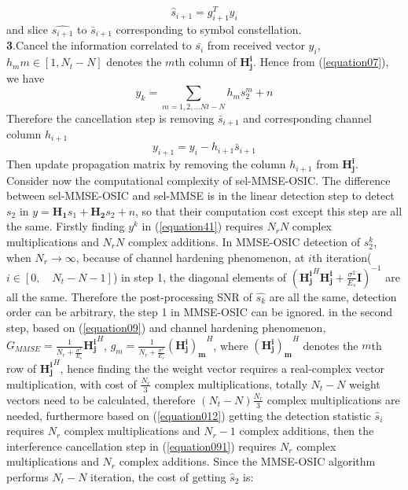 \documentclass[12pt,a4paper,final]{article}
\begin{document}
\begin{spacing}{2.5}
\begin{equation}
\hat{s}_{i+1}=g_{i+1}^{T}y_{i}\label{equation012}
\end{equation}
and slice $\widehat{s_{i+1}}$ to $\bar{s}_{i+1}$ corresponding to symbol constellation.\\
\textbf{3}.Cancel the information correlated to  $\bar{s_{i}}$ from received vector $y_{i}$, $h_{m} m\in [1,N_{t}-N]$ denotes the $m$th column of $\mathbf{H_{j}^{i}}$. Hence from (\ref{equation07}), we have
\begin{equation}
y_{k}=\sum_{m=1,2,\ldots Nt-N}h_{m}s_{2}^{m}+n
\end{equation}
Therefore the cancellation step is removing $\bar{s}_{i+1}$ and corresponding channel column $h_{i+1}$
\begin{equation}
y_{i+1}=y_{i}-h_{i+1}\bar{s}_{i+1}\label{equation091}
\end{equation} 
Then update propagation matrix by removing the column $h_{i+1}$ from $\mathbf{H_{j}^{i}}$.\\
Consider now the computational complexity of sel-MMSE-OSIC. The difference between sel-MMSE-OSIC and sel-MMSE is in the linear detection step to detect $s_{2}$ in $y=\mathbf{H_{1}}s_{1}+\mathbf{H_{2}}s_{2}+n$, so that their computation cost except this step are all the same. Firstly finding $y^{k}$ in (\ref{equation41}) requires $N_{r}N$ complex multiplications and $N_{r}N$ complex additions. In MMSE-OSIC detection of $s_{2}^{k}$, when $N_{r}\to \infty$, because of channel hardening phenomenon, at $i$th iteration($i\in [0,\quad N_{t}-N-1]$) in step 1, the diagonal elements of $(\mathbf{H^{i}_{j}}^{H}\mathbf{H^{i}_{j}}+\frac{\sigma^{2}}{E_{s}}\mathbf{I})^{-1}$ are all the same. Therefore the post-processing SNR of $\hat{s_{k}}$ are all the same, detection order can be arbitrary, the step 1 in MMSE-OSIC can be ignored. in the second step, based on (\ref{equation09}) and channel hardening phenomenon, $G_{MMSE}=\frac{1}{N_{r}+\frac{\sigma^{2}}{E_{s}}}\mathbf{H^{i}_{j}}^{H}$, $g_{m}=\frac{1}{N_{r}+\frac{\sigma^{2}}{E_{s}}}\mathbf{(H^{i}_{j})_{m}}^{H}$, where $\mathbf{(H^{i}_{j})_{m}}^{H}$ denotes the $m$th row of $\mathbf{H^{i}_{j}}^{H}$, hence finding the the weight vector requires a real-complex vector multiplication, with cost of $\frac{N_{r}}{3}$ complex multiplications, totally $N_{t}-N$ weight vectors need to be calculated, therefore $(N_{t}-N)\frac{N_{r}}{3}$ complex multiplications are needed, furthermore based on (\ref{equation012}) getting the detection statistic $\hat{s}_{i}$ requires $N_{r}$ complex multiplications and $N_{r}-1$ complex additions, then the interference cancellation step in (\ref{equation091}) requires $N_{r}$ complex multiplications and $N_{r}$ complex additions.  Since the MMSE-OSIC algorithm performs $N_{t}-N$ iteration, the cost of getting $\hat{s}_{2}$ is:

\end{spacing}
\end{document}
